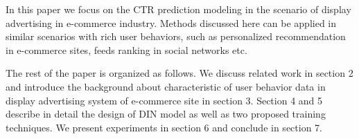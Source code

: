 In this paper we focus on the CTR prediction modeling in the scenario of display advertising in e-commerce industry. 
Methods discussed here can be applied in similar scenarios with rich user behaviors, such as personalized recommendation in e-commerce sites, feeds ranking in social networks etc.

The rest of the paper is organized as follows. We discuss related work in section 2 and introduce the background about characteristic of user behavior data in display advertising system of e-commerce site in section 3. Section 4 and 5 describe in detail the design of DIN model as well as two proposed training techniques. We present experiments in section 6 and conclude in section 7. 







